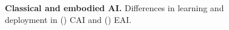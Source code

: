 \documentclass[12pt]{article}
\begin{document}
\begin{figure}[t!]
\begin{subfigure}[t]{0.45\textwidth}
	\end{subfigure}	
	\hspace*{\fill}
	\caption[] {\label{fig:cai_and_eai_general} \textbf{Classical and embodied AI.} Differences in learning and deployment in () CAI and ()  EAI. %
	}
\end{figure}
\end{document}
